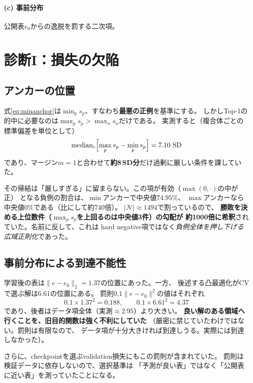 \documentclass[11pt,a4paper]{article}
\begin{document}
\paragraph{(c) 事前分布}
公開表$e_0$からの逸脱を罰する二次項。

\section{診断I：損失の欠陥}

\subsection{アンカーの位置}

式\eqref{eq:minanchor}は$\min_{p} s_p$、すなわち\textbf{最悪の正例}を基準にする。
しかしTop-1の的中に必要なのは$\max_p s_p > \max_n s_n$だけである。
実測すると（複合体ごとの標準偏差を単位として）
\begin{equation}
  \operatorname{median}_c\Bigl[\max_{p} s_p - \min_{p} s_p\Bigr] = 7.10\ \mathrm{SD}
\end{equation}
であり、マージン$m = 1$と合わせて\textbf{約8\,SD分}だけ過剰に厳しい条件を課していた。

その帰結は「厳しすぎる」に留まらない。この項が有効（$\max(0,\cdot)$の中が正）
となる負例の割合は、$\min$アンカーで中央値$74.95\%$、
$\max$アンカーなら中央値$0\%$である（比にして約$740$倍）。
$|\mathcal{N}| \approx 1494$で割っているので、
\textbf{勝敗を決める上位数件（$\max_p s_p$を上回るのは中央値3件）の勾配が
約1000倍に希釈}されていた。名前に反して、これは
hard negative項ではなく\emph{負例全体を押し下げる広域正則化}であった。

\subsection{事前分布による到達不能性}

学習後の表は$\|e - e_0\|_2 = 1.37$の位置にあった。一方、
後述する凸最適化がCVで選ぶ解は$6.61$の位置にある。
罰則$0.1\|e-e_0\|^2$の値はそれぞれ
\begin{equation}
  0.1 \times 1.37^2 = 0.188, \qquad 0.1 \times 6.61^2 = 4.37
\end{equation}
であり、後者はデータ項全体（実測$\approx 2.95$）より大きい。
\textbf{良い解のある領域へ行くことを、旧目的関数は強く不利にしていた}
（厳密に禁じていたわけではない。罰則は有限なので、
データ項が十分大きければ到達しうる。実際には到達しなかった）。

さらに、checkpointを選ぶvalidation損失にもこの罰則が含まれていた。
罰則は検証データに依存しないので、選択基準は
「予測が良い表」ではなく「公開表に近い表」を測っていたことになる。
\end{document}

